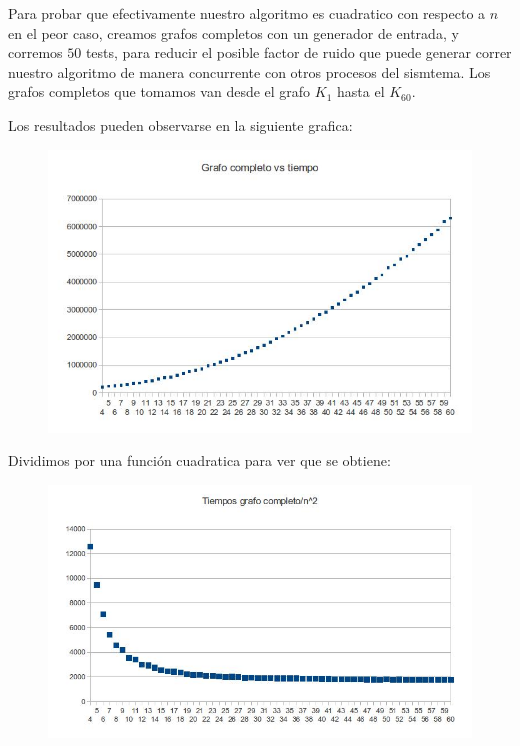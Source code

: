 Para probar que efectivamente nuestro algoritmo es cuadratico con respecto a $n$ en el peor caso, creamos grafos completos con un generador de entrada, y corremos $50$ tests, para reducir el posible factor de ruido que puede generar correr nuestro algoritmo de manera concurrente con otros procesos del sismtema.
Los grafos completos que tomamos van desde el grafo $K_1$ hasta el $K_60$.

Los resultados pueden observarse en la siguiente grafica:

\begin{figure}[h!]
  \begin{center}
	\includegraphics[scale=0.5]{Ej3/resultados1.jpg}
	\label{nombreparareferenciar}
  \end{center}
\end{figure}

\newpage
Dividimos por una función cuadratica para ver que se obtiene:

\begin{figure}[h!]
  \begin{center}
	\includegraphics[scale=0.5]{Ej3/resultados2.jpg}
	\label{nombreparareferenciar}
  \end{center}
\end{figure}

